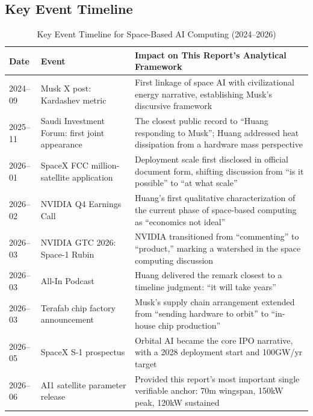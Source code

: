 \subsection{Key Event Timeline}

\begin{table}[H]
\centering
\caption{Key Event Timeline for Space-Based AI Computing (2024--2026)}
\label{tab:timeline}
\small
\begin{tabular}{p{2.0cm}p{3.5cm}p{8.0cm}}
\toprule
\textbf{Date} & \textbf{Event} & \textbf{Impact on This Report's Analytical Framework} \\
\midrule
2024--09 & Musk X post: Kardashev metric & First linkage of space AI with civilizational energy narrative, establishing Musk's discursive framework\cite{musk2024kardashev} \\
2025--11 & Saudi Investment Forum: first joint appearance & The closest public record to ``Huang responding to Musk''; Huang addressed heat dissipation from a hardware mass perspective\cite{musk_huang2025saudi} \\
2026--01 & SpaceX FCC million-satellite application & Deployment scale first disclosed in official document form, shifting discussion from ``is it possible'' to ``at what scale''\cite{spacex2026fcc} \\
2026--02 & NVIDIA Q4 Earnings Call & Huang's first qualitative characterization of the current phase of space-based computing as ``economics not ideal''\cite{huang2026earnings} \\
2026--03 & NVIDIA GTC 2026: Space-1 Rubin & NVIDIA transitioned from ``commenting'' to ``product,'' marking a watershed in the space computing discussion\cite{huang2026gtc} \\
2026--03 & All-In Podcast & Huang delivered the remark closest to a timeline judgment: ``it will take years''\cite{huang2026allin} \\
2026--03 & Terafab chip factory announcement & Musk's supply chain arrangement extended from ``sending hardware to orbit'' to ``in-house chip production''\cite{musk2026terafab} \\
2026--05 & SpaceX S-1 prospectus & Orbital AI became the core IPO narrative, with a 2028 deployment start and 100\;GW/yr target\cite{spacex2026s1} \\
2026--06 & AI1 satellite parameter release & Provided this report's most important single verifiable anchor: 70\;m wingspan, 150\;kW peak, 120\;kW sustained\cite{spacex2026ai1} \\
\bottomrule
\end{tabular}
\end{table}

